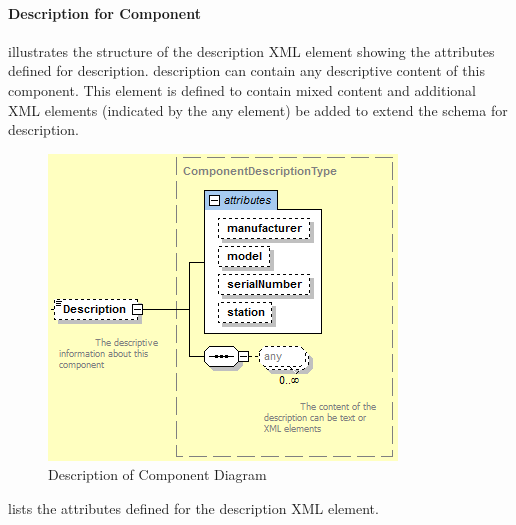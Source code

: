 \documentclass{mtconnect}	%
\begin{document}
\paragraph{Description for Component}\mbox{}

 illustrates the structure of the \gls{description} XML element showing the attributes defined for \gls{description}.  \gls{description} can contain any descriptive content of this \gls{component}.  This element is defined to contain mixed content and additional XML elements (indicated by the \gls{any} element) \may be added to extend the schema for \gls{description}.

\begin{figure}[ht]
  \centering
  \includegraphics[width=.75\textwidth]{figures/description-of-component-schema-diagram.png}
  \caption{Description of Component Diagram}
  \label{fig:description-of-component-schema-diagram}
\end{figure}

\FloatBarrier

 lists the attributes defined for the \gls{description} XML element.
\end{document}
